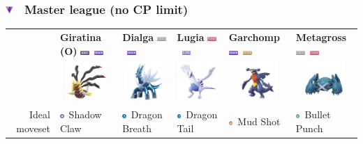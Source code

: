 \documentclass[8pt,aspectratio=169,compress]{beamer}
\newcommand{\flyingfull}{\includegraphics[height=0.15cm]{../../images/type/full/Flying.png}}
\newcommand{\ghostfull}{\includegraphics[height=0.15cm]{../../images/type/full/Ghost.png}}
\newcommand{\dragonfull}{\includegraphics[height=0.15cm]{../../images/type/full/Dragon.png}}
\newcommand{\groundfull}{\includegraphics[height=0.15cm]{../../images/type/full/Ground.png}}
\newcommand{\psychicfull}{\includegraphics[height=0.15cm]{../../images/type/full/Psychic.png}}
\newcommand{\steelfull}{\includegraphics[height=0.15cm]{../../images/type/full/Steel.png}}
\newcommand{\dragonsimp}{\includegraphics[height=0.15cm]{../../images/type/simplified/dragon.png}}
\newcommand{\ghostsimp}{\includegraphics[height=0.15cm]{../../images/type/simplified/ghost.png}}
\newcommand{\groundsimp}{\includegraphics[height=0.15cm]{../../images/type/simplified/ground.png}}
\newcommand{\steelsimp}{\includegraphics[height=0.15cm]{../../images/type/simplified/steel.png}}
\begin{document}
\begin{frame}
\frametitle{\includegraphics[width=0.3cm]{../../images/league/master_league.png} ~Master league (no CP limit)}

\begin{tiny}
\begin{block}{}
\begin{center}

\begin{tabular}{rp{2cm}p{2cm}p{2cm}p{2cm}p{2cm}} 
  & \textbf{Giratina (O)} \hfill \ghostfull~\dragonfull& \textbf{Dialga} \hfill \steelfull~\dragonfull & \textbf{Lugia} \hfill\psychicfull~\flyingfull &\textbf{Garchomp} \hfill\dragonfull~\groundfull&\textbf{Metagross} \hfill\steelfull~\psychicfull \\ 
  & \multicolumn{1}{c}{\includegraphics[width=1.5cm]{../../images/pokemon/giratina_o}} &  \multicolumn{1}{c}{\includegraphics[width=1.5cm]{../../images/pokemon/dialga} } & \multicolumn{1}{c}{\includegraphics[width=1.5cm]{../../images/pokemon/lugia} } & \multicolumn{1}{c}{\includegraphics[width=1.5cm]{../../images/pokemon/garchomp} } & \multicolumn{1}{c}{\includegraphics[width=1.5cm]{../../images/pokemon/metagross} }  \\ \hline 
   \multirow{3}{*}{Ideal moveset}  & \ghostsimp~Shadow Claw & \dragonsimp~Dragon Breath & \dragonsimp~Dragon Tail & \groundsimp~Mud Shot& \steelsimp~Bullet Punch \\

\end{tabular}
\end{center}
\end{block}
\end{tiny}
\end{frame}
\end{document}
